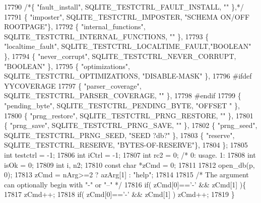\begin{DoxyCode}
{{{{{{{{{{{{{{{{{{{{{{{{{{{{{{{{{{{{{{{{{{{{{{{{{{{{{{{{{{{{{{{{{{{{{{{{{{{{{{{{{{{{{{{{{{{{{{{{{{{{{{{{{{{{{{{{{{{{{{{{{{{{{{{{{{{{{{{{{{{{17790     \textcolor{comment}{/*\{ "fault\_install",      SQLITE\_TESTCTRL\_FAULT\_INSTALL, ""             \},*/}
17791       \{ \textcolor{stringliteral}{"imposter"},         SQLITE_TESTCTRL_IMPOSTER, \textcolor{stringliteral}{"SCHEMA ON/OFF ROOTPAGE"}\},
17792       \{ \textcolor{stringliteral}{"internal\_functions"}, SQLITE_TESTCTRL_INTERNAL_FUNCTIONS, \textcolor{stringliteral}{""} \},
17793       \{ \textcolor{stringliteral}{"localtime\_fault"},    SQLITE_TESTCTRL_LOCALTIME_FAULT,\textcolor{stringliteral}{"BOOLEAN"}       \},
17794       \{ \textcolor{stringliteral}{"never\_corrupt"},      SQLITE_TESTCTRL_NEVER_CORRUPT, \textcolor{stringliteral}{"BOOLEAN"}        \},
17795       \{ \textcolor{stringliteral}{"optimizations"},      SQLITE_TESTCTRL_OPTIMIZATIONS, \textcolor{stringliteral}{"DISABLE-MASK"}   \},
17796 \textcolor{preprocessor}{#ifdef YYCOVERAGE}
17797       \{ \textcolor{stringliteral}{"parser\_coverage"},    SQLITE_TESTCTRL_PARSER_COVERAGE, \textcolor{stringliteral}{""}             \},
17798 \textcolor{preprocessor}{#endif}
17799       \{ \textcolor{stringliteral}{"pending\_byte"},       SQLITE_TESTCTRL_PENDING_BYTE,  \textcolor{stringliteral}{"OFFSET  "}       \},
17800       \{ \textcolor{stringliteral}{"prng\_restore"},       SQLITE_TESTCTRL_PRNG_RESTORE,  \textcolor{stringliteral}{""}               \},
17801       \{ \textcolor{stringliteral}{"prng\_save"},          SQLITE_TESTCTRL_PRNG_SAVE,     \textcolor{stringliteral}{""}               \},
17802       \{ \textcolor{stringliteral}{"prng\_seed"},          SQLITE_TESTCTRL_PRNG_SEED,     \textcolor{stringliteral}{"SEED ?db?"}      \},
17803       \{ \textcolor{stringliteral}{"reserve"},            SQLITE_TESTCTRL_RESERVE,      \textcolor{stringliteral}{"BYTES-OF-RESERVE"}\},
17804     \};
17805     \textcolor{keywordtype}{int} testctrl = -1;
17806     \textcolor{keywordtype}{int} iCtrl = -1;
17807     \textcolor{keywordtype}{int} rc2 = 0;    \textcolor{comment}{/* 0: usage.  1: %
17808     \textcolor{keywordtype}{int} isOk = 0;
17809     \textcolor{keywordtype}{int} i, n2;
17810     \textcolor{keyword}{const} \textcolor{keywordtype}{char} *zCmd = 0;
17811 
17812     open_db(p, 0);
17813     zCmd = nArg>=2 ? azArg[1] : \textcolor{stringliteral}{"help"};
17814 
17815     \textcolor{comment}{/* The argument can optionally begin with "-" or "--" */}
17816     \textcolor{keywordflow}{if}( zCmd[0]==\textcolor{charliteral}{'-'} && zCmd[1] )\{
17817       zCmd++;
17818       \textcolor{keywordflow}{if}( zCmd[0]==\textcolor{charliteral}{'-'} && zCmd[1] ) zCmd++;
17819     \}
}}}}}}}}}}}}}}}}}}}}}}}}}}}}}}}}}}}}}}}}}}}}}}}}}}}}}}}}}}}}}}}}}}}}}}}}}}}}}}}}}}}}}}}}}}}}}}}}}}}}}}}}}}}}}}}}}}}}}}}}}}}}}}}}}}}}}}}}}}}}}
\end{DoxyCode}
